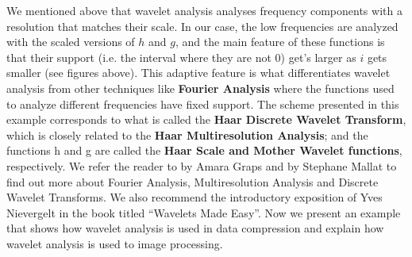 We mentioned above that wavelet analysis analyses frequency components with a resolution that matches their scale. In our case, the low frequencies are analyzed with the scaled versions of $h$ and $g$, and the main feature of these functions is that their support (i.e. the interval where they are not 0) get's larger as $i$ gets smaller (see figures above). This adaptive feature is what differentiates wavelet analysis from other techniques like \textbf{Fourier Analysis} where the functions used to analyze different frequencies have fixed support. The scheme presented in this example corresponds to what is called the \textbf{Haar Discrete Wavelet Transform}, which is closely related to the \textbf{Haar Multiresolution Analysis}; and the functions h and g are called the \textbf{Haar Scale and Mother Wavelet functions}, respectively. We refer the reader to  by Amara Graps and  by Stephane Mallat to find out more about Fourier Analysis, Multiresolution Analysis and Discrete Wavelet Transforms. We also recommend the introductory exposition of Yves Nievergelt in the book titled ``Wavelets Made Easy''. Now we present an example that shows how wavelet analysis is used in data compression and explain how wavelet analysis is used to image processing. \\

 \vspace{0.2cm}


